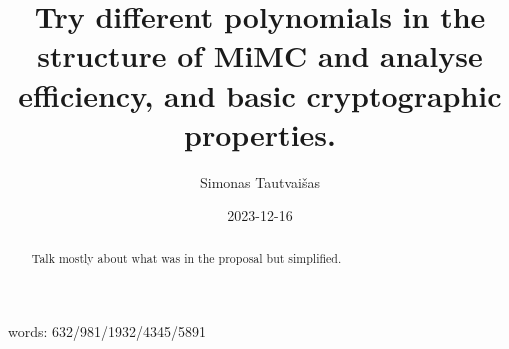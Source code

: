 \documentclass{Resources/UoBLab1}
\theoremstyle{definition}
\begin{document}

\title{Try different polynomials in the structure of MiMC and analyse efficiency, and basic cryptographic properties.}
\author{Simonas Tautvaišas}
\date{2023-12-16}

\maketitle


words: 632/981/1932/4345/5891

\begin{abstract}
    Talk mostly about what was in the proposal but simplified.
\end{abstract}

\end{document}

